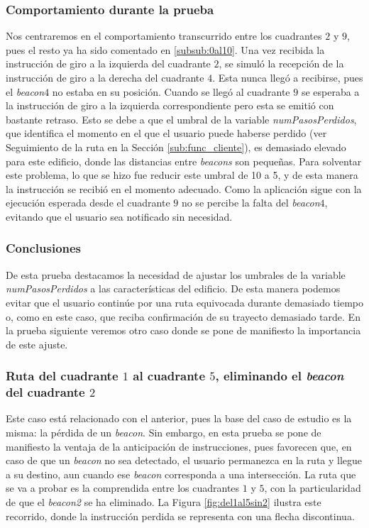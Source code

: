 \subsubsection*{Comportamiento durante la prueba}

Nos centraremos en el comportamiento transcurrido entre los cuadrantes $2$ y $9$, pues el resto ya ha sido comentado en \ref{subsub:0al10}. Una vez recibida la instrucción de giro a la izquierda del cuadrante $2$, se simuló la recepción de la instrucción de giro a la derecha del cuadrante $4$. Esta nunca llegó a recibirse, pues el \textit{beacon$4$} no estaba en su posición. Cuando se llegó al cuadrante $9$ se esperaba a la instrucción de giro a la izquierda correspondiente pero esta se emitió con bastante retraso. Esto se debe a que el umbral de la variable \textit{numPasosPerdidos}, que identifica el momento en el que el usuario puede haberse perdido (ver Seguimiento de la ruta en la Sección \ref{sub:func_cliente}), es demasiado elevado para este edificio, donde las distancias entre \textit{beacons} son pequeñas. Para solventar este problema, lo que se hizo fue reducir este umbral de 10 a 5, y de esta manera la instrucción se recibió en el momento adecuado. Como la aplicación sigue con la ejecución esperada desde el cuadrante $9$ no se percibe la falta del \textit{beacon$4$}, evitando que el usuario sea notificado sin necesidad.


\subsubsection*{Conclusiones}

De esta prueba destacamos la necesidad de ajustar los umbrales de la variable \textit{numPasosPerdidos} a las características del edificio. De esta manera podemos evitar que el usuario continúe por una ruta equivocada durante demasiado tiempo o, como en este caso, que reciba confirmación de su trayecto demasiado tarde. En la prueba siguiente veremos otro caso donde se pone de manifiesto la importancia de este ajuste.


\subsubsection{Ruta del cuadrante $1$ al cuadrante $5$, eliminando el \textit{beacon} del cuadrante $2$}
\label{subsub:1al5sin2}

Este caso está relacionado con el anterior, pues la base del caso de estudio es la misma: la pérdida de un \textit{beacon}. Sin embargo, en esta prueba se pone de manifiesto la ventaja de la anticipación de instrucciones, pues favorecen que, en caso de que un \textit{beacon} no sea detectado, el usuario permanezca en la ruta y llegue a su destino, aun cuando ese \textit{beacon} corresponda a una intersección. La ruta que se va a probar es la comprendida entre los cuadrantes $1$ y $5$, con la particularidad de que el \textit{beacon2} se ha eliminado. La Figura \ref{fig:del1al5sin2} ilustra este recorrido, donde la instrucción perdida se representa con una flecha discontinua.

